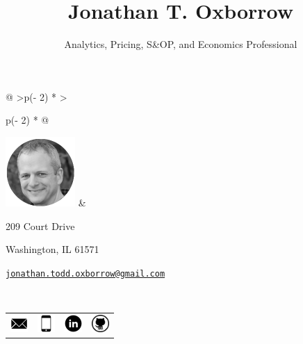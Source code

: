 \documentclass[
  letterpaper,
  DIV=11,
  numbers=noendperiod]{scrartcl}
\title{Jonathan T. Oxborrow}
\subtitle{Analytics, Pricing, S\&OP, and Economics Professional}
\author{}
\date{}
\begin{document}
\maketitle
\ifdefined\Shaded\renewenvironment{Shaded}{\begin{tcolorbox}[breakable, boxrule=0pt, borderline west={3pt}{0pt}{shadecolor}, interior hidden, frame hidden, sharp corners, enhanced]}{\end{tcolorbox}}\fi

\begin{longtable}[]{@{}
  >{\centering\arraybackslash}p{(\columnwidth - 2\tabcolsep) * }
  >{\raggedright\arraybackslash}p{(\columnwidth - 2\tabcolsep) * }@{}}
\toprule\noalign{}
\endhead
\bottomrule\noalign{}
\endlastfoot
\includegraphics[width=1.04167in,height=\textheight]{assets/avatar.png}
& \begin{minipage}[t]{\linewidth}\raggedright
209 Court Drive

Washington, IL 61571

\href{mailto:jonathan.todd.oxborrow@gmail.com}{\nolinkurl{jonathan.todd.oxborrow@gmail.com}}
\end{minipage} \\
\end{longtable}

\hypertarget{social-links}{}
\begin{longtable}[]{@{}
  >{\centering\arraybackslash}p{}
  >{\centering\arraybackslash}p{}
  >{\centering\arraybackslash}p{}
  >{\centering\arraybackslash}p{}@{}}
\toprule\noalign{}
\endhead
\bottomrule\noalign{}
\endlastfoot
\href{mailto:jonathan.todd.oxborrow@gmail.com}{\includegraphics[width=0.26042in,height=\textheight]{assets/envelope.png}}
&
\href{tel:309-822-2113}{\includegraphics[width=0.26042in,height=\textheight]{assets/cell-phone.png}}
&
\href{https://www.linkedin.com/in/joxborrow1}{\includegraphics[width=0.26042in,height=\textheight]{assets/linkedin-round.png}}
&
\href{http://github.com/joxborrow}{\includegraphics[width=0.26042in,height=\textheight]{assets/github-icon-logo-png-transparent.png}} \\
\end{longtable}
\end{document}
